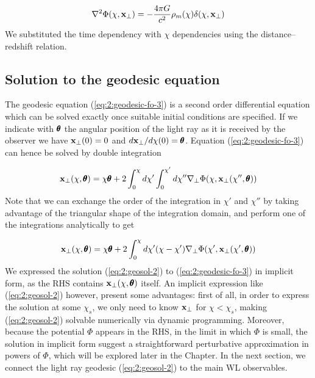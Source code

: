 \begin{equation}
\label{eq:2:poisson}
\nabla^2\Phi(\chi,\mathbf{x}_\perp) = -\frac{4\pi G}{c^2}\rho_m(\chi)\delta(\chi,\mathbf{x}_\perp)
\end{equation}  
%
We substituted the time dependency with $\chi$ dependencies using the distance--redshift relation. 

\subsection{Solution to the geodesic equation}
The geodesic equation (\ref{eq:2:geodesic-fo-3}) is a second order differential equation which can be solved exactly once suitable initial conditions are specified. If we indicate with $\pmb{\theta}$ the angular position of the light ray as it is received by the observer we have $\mathbf{x}_\perp(0)=0$ and $d\mathbf{x}_\perp /d\chi(0)=\pmb{\theta}$. Equation (\ref{eq:2:geodesic-fo-3}) can hence be solved by double integration

\begin{equation}
\label{eq:2:geosol-1}
\mathbf{x}_\perp(\chi,\pmb{\theta}) = \chi\pmb{\theta} + 2\int_0^\chi d\chi'\int_0^{\chi'}d\chi'' \nabla_\perp\Phi(\chi,\mathbf{x}_\perp(\chi'',\pmb{\theta}))
\end{equation} 
%
Note that we can exchange the order of the integration in $\chi'$ and $\chi''$ by taking advantage of the triangular shape of the integration domain, and perform one of the integrations analytically to get

\begin{equation}
\label{eq:2:geosol-2}
\mathbf{x}_\perp(\chi,\pmb{\theta}) = \chi\pmb{\theta} + 2\int_0^\chi d\chi'(\chi-\chi')\nabla_\perp\Phi(\chi',\mathbf{x}_\perp(\chi',\pmb{\theta}))
\end{equation} 
%
We expressed the solution (\ref{eq:2:geosol-2}) to (\ref{eq:2:geodesic-fo-3}) in implicit form, as the RHS contains $\mathbf{x}_\perp(\chi,\pmb{\theta})$ itself. An implicit expression like (\ref{eq:2:geosol-2}) however, present some advantages: first of all, in order to express the solution at some $\chi_s$, we only need to know $\mathbf{x}_\perp$ for $\chi<\chi_s$, making (\ref{eq:2:geosol-2}) solvable numerically via dynamic programming. Moreover, because the potential $\Phi$ appears in the RHS, in the limit in which $\Phi$ is small, the solution in implicit form suggest a straightforward perturbative approximation in powers of $\Phi$, which will be explored later in the Chapter. In the next section, we connect the light ray geodesic (\ref{eq:2:geosol-2}) to the main WL observables.  



